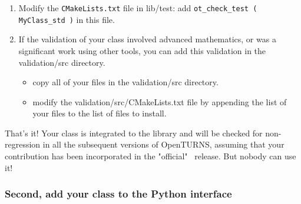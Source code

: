 \begin{enumerate}
\item Modify the \verb!CMakeLists.txt! file in lib/test: add \verb!ot_check_test ( MyClass_std )! in this file.

\item If the validation of your class involved advanced mathematics, or was a significant work using other tools, you can add this validation in the validation/src directory.
\begin{itemize}
\item copy all of your files in the validation/src directory.
\item modify the validation/src/CMakeLists.txt file by appending the list of your files to the list of files to install.
\end{itemize}
\setcounter{oldenumi}{\value{enumi}}
\end{enumerate}

That's it! Your class is integrated to the library and will be checked for non-regression in all the subsequent versions of OpenTURNS, assuming that your contribution has been incorporated in the "official" \OT\ release. But nobody can use it!

\subsubsection{Second, add your class to the Python interface}

